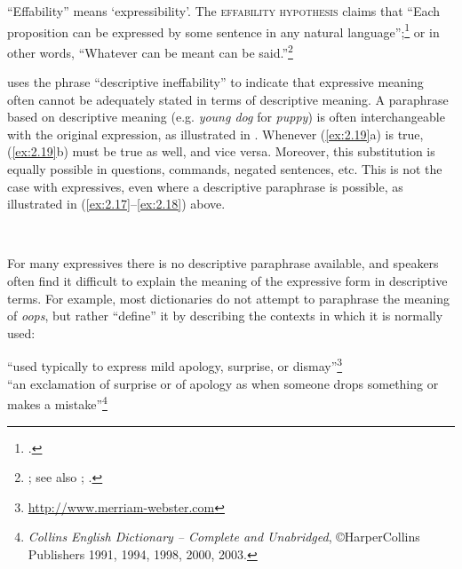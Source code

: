 “Effability” means ‘expressibility’. The \textsc{effability hypothesis} claims that “Each proposition can be expressed by some sentence in any natural language”;\footnote{\citet[209]{Katz1978}.} or in other words, “Whatever can be meant can be said.”\footnote{\citet[18]{Searle1969}; see also \citet[18--24]{Katz1972}; \citet[33]{Carston2002}.}



\citet{Potts2007c} uses the phrase “descriptive ineffability” to indicate that expressive meaning often cannot be adequately stated in terms of descriptive meaning. A paraphrase based on descriptive meaning (e.g. \textit{young dog} for \textit{puppy}) is often interchangeable with the original expression, as illustrated in . Whenever (\ref{ex:2.19}a) is true, (\ref{ex:2.19}b) must be true as well, and vice versa. Moreover, this substitution is equally possible in questions, commands, negated sentences, etc. This is not the case with expressives, even where a descriptive paraphrase is possible, as illustrated in (\ref{ex:2.17}--\ref{ex:2.18}) above.


\ea \label{ex:2.19}
\\
                       \z
\z


For many expressives there is no descriptive paraphrase available, and speakers often find it difficult to explain the meaning of the expressive form in descriptive terms. For example, most dictionaries do not attempt to paraphrase the meaning of \textit{oops}, but rather “define” it by describing the contexts in which it is normally used:


\ea

\ea “used typically to express mild apology, surprise, or dismay”\footnote{\url{http://www.merriam-webster.com}}\\
\ex “an exclamation of surprise or of apology as when someone drops something or makes a mistake”\footnote{\textit{Collins English Dictionary – Complete and Unabridged}, ©HarperCollins Publishers 1991, 1994, 1998, 2000, 2003.} \\ 
\z
\z


